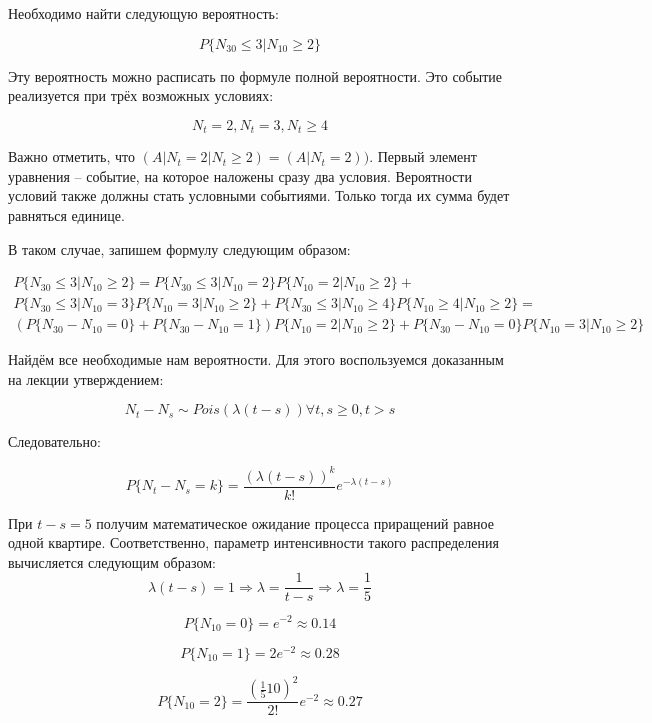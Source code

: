 \documentclass[a4paper,12pt]{article}
\begin{document}
Необходимо найти следующую вероятность: 

\[ P\{ N_{30} \le 3 | N_{10} \ge 2 \} \]

Эту вероятность можно расписать по формуле полной вероятности. Это событие реализуется при трёх возможных условиях:

\[ N_t = 2, N_t = 3, N_t \ge 4 \]

Важно отметить, что $ (A|N_t = 2 | N_t \ge 2) = (A|N_t = 2)) $. Первый элемент уравнения -- событие, на которое наложены сразу два условия. Вероятности условий также должны стать условными событиями. Только тогда их сумма будет равняться единице.



В таком случае, запишем формулу следующим образом:

\begin{equation}
\begin{aligned}
 P\{ N_{30} \le 3 | N_{10} \ge 2 \}  = P\{ N_{30} \le 3 | N_{10} = 2 \} P\{ N_{10} = 2 | N_{10} \ge 2 \} + & \\ P\{ N_{30} \le 3 | N_{10} = 3 \} P\{ N_{10} = 3 | N_{10} \ge 2 \} + P\{ N_{30} \le 3 | N_{10} \ge 4 \} P\{ N_{10} \ge 4 | N_{10} \ge 2 \} = & \\(P\{ N_{30} - N_{10} = 0 \} + P\{ N_{30} - N_{10} = 1 \}) P\{ N_{10} = 2 | N_{10} \ge 2 \} + P\{ N_{30} - N_{10} = 0 \} P\{ N_{10} = 3 | N_{10} \ge 2 \}
\end{aligned}
\end{equation}

Найдём все необходимые нам вероятности. Для этого воспользуемся доказанным на лекции утверждением:

\[ N_t - N_s \sim Pois(\lambda(t - s)) \forall t,s \ge 0, t > s \]

Следовательно:

\[ P\{ N_t - N_s = k \} = \frac{(\lambda(t-s))^k}{k!}e^{-\lambda(t-s)}\]



При $ t - s = 5 $ получим математическое ожидание процесса приращений равное одной квартире. Соответственно, параметр интенсивности такого распределения вычисляется следующим образом:
\[  \lambda(t - s) = 1 \Rightarrow \lambda = \frac{1}{t-s} \Rightarrow \lambda = \frac{1}{5}\]


\[ P\{N_{10} = 0 \} =  e^{-2}  \approx 0.14\]

\[ P\{N_{10} = 1 \} =  2e^{-2}  \approx 0.28\]

\[ P\{N_{10} = 2 \} = \frac{(\frac{1}{5} 10)^2}{2!} e^{-2}  \approx 0.27\]
\end{document}
